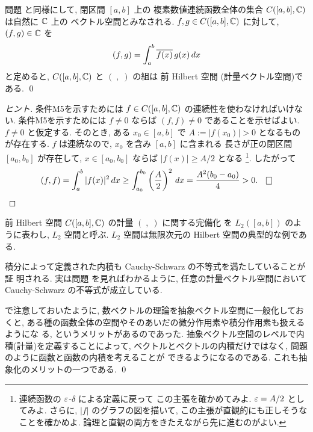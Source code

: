 \documentclass[12pt,twoside]{jarticle}
\begin{document}

\begin{question}
  \label{q:L2[a,b]}
  問題  と同様にして, 閉区間 $[a,b]$ 上の
  複素数値連続函数全体の集合 $C([a,b],{\mathbb C})$ は自然に ${\mathbb C}$ 上の
  ベクトル空間とみなされる.
  $f,g\in C([a,b],{\mathbb C})$ に対して, $(f,g)\in{\mathbb C}$ を
  \begin{equation*}
    (f,g) = \int_a^b \overline{f(x)}\,g(x)\,dx
  \end{equation*}
  と定めると, $C([a,b],{\mathbb C})$ と $(\;,\;)$ の組は
  前 Hilbert 空間 (計量ベクトル空間)である.
  \qed
\end{question}

\begin{proof}[ヒント]
  条件M5を示すためには $f\in C([a,b],{\mathbb C})$ の連続性を使わなければいけない.
  条件M5を示すためには $f\ne 0$ ならば $(f,f)\ne 0$ であることを示せばよい.
  $f\ne 0$ と仮定する.
  そのとき, ある $x_0\in [a,b]$ で $A:=|f(x_0)|>0$ となるもの
  が存在する.  $f$ は連続なので, $x_0$ を含み $[a,b]$ に含まれる
  長さが正の閉区間 $[a_0,b_0]$ が存在して, 
  $x\in[a_0,b_0]$ ならば $|f(x)|\ge A/2$ となる%
  \footnote{連続函数の $\varepsilon$-$\delta$ による定義に戻って
    この主張を確かめてみよ.  $\varepsilon=A/2$ としてみよ.
    さらに, $|f|$ のグラフの図を描いて, この主張が直観的にも正しそうな
    ことを確かめよ.  論理と直観の両方をきたえながら先に進むのがよい.}.
  したがって
  \begin{equation*}
    (f,f) 
    = \int_a^b |f(x)|^2\,dx 
    \ge \int_{a_0}^{b_0} \left(\frac{A}{2}\right)^2\,dx
    = \frac{A^2(b_0-a_0)}{4} 
    > 0.
    \qed
  \end{equation*}
\end{proof}

\begin{guide}
  前 Hilbert 空間 $C([a,b],{\mathbb C})$ の計量 $(\;,\;)$ に関する完備化
  を $L_2([a,b])$ のように表わし, $L_2$ 空間と呼ぶ. 
  $L_2$ 空間は無限次元の Hilbert 空間の典型的な例である.

  積分によって定義された内積も Cauchy-Schwarz の不等式を満たしていることが証
  明される.  実は問題  を見ればわかるように,
  任意の計量ベクトル空間において Cauchy-Schwarz の不等式が成立している.

  で注意しておいたように, 
  数ベクトルの理論を抽象ベクトル空間に一般化しておくと,
  ある種の函数全体の空間やそのあいだの微分作用素や積分作用素も扱えるようにな
  る, というメリットがあるのであった.
  抽象ベクトル空間のレベルで内積(計量)を定義することによって, 
  ベクトルとベクトルの内積だけではなく, 
  問題  のように函数と函数の内積を考えることが
  できるようになるのである.
  これも抽象化のメリットの一つである.
  \qed
\end{guide}
\end{document}
